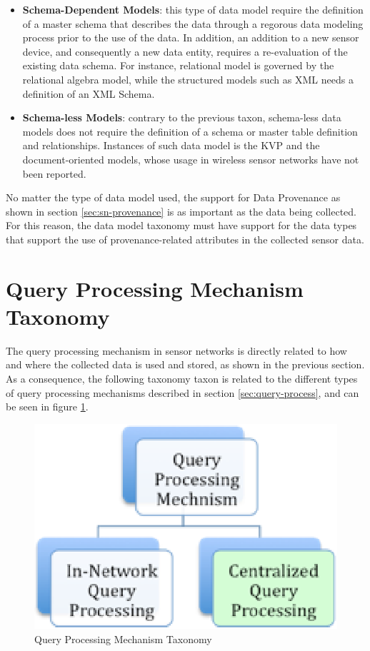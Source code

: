 \begin{itemize}
  \item \textbf{Schema-Dependent Models}: this type of data model require
  the definition of a master schema that describes the data through a regorous
  data modeling process prior to the use of the data. In addition, an addition
 to a new sensor device, and consequently a new data entity, requires a
 re-evaluation of the existing data schema. For instance, relational model is
 governed by the relational algebra model, while the structured models such as
 XML needs a definition of an XML Schema.
  \item \textbf{Schema-less Models}: contrary to the previous taxon, 
  schema-less data models does not require the definition of a schema or master
  table definition and relationships. Instances of such data model is the KVP
  and the document-oriented models, whose usage in wireless sensor networks
  have not been reported.
\end{itemize}

No matter the type of data model used, the support for Data Provenance as shown
in section \ref{sec:sn-provenance} is as important as the data being
collected. For this reason, the data model taxonomy must have support for the
data types that support the use of provenance-related attributes in the
collected sensor data.

\section{Query Processing Mechanism Taxonomy}

The query processing mechanism in sensor networks is directly related to how
and where the collected data is used and stored, as shown in the previous
section. As a consequence, the following taxonomy taxon is related to the
different types of query processing mechanisms described in section
\ref{sec:query-process}, and can be seen in figure
\ref{fig:taxonomy-query-mechanism}.

\begin{figure}[h]
  \centering
  \includegraphics{../diagrams/taxonomy-query-mechanism}
  \caption{Query Processing Mechanism Taxonomy}
  \label{fig:taxonomy-query-mechanism}
\end{figure}

